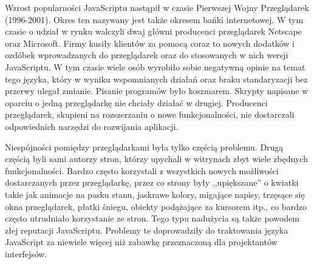 Wzrost popularności JavaScriptu nastąpił w czasie Pierwszej Wojny Przeglądarek (1996-2001)\cite{stefanov10}. Okres ten nazywany jest także okresem bańki internetowej. W tym czasie o udział w rynku walczyli dwaj główni producenci przeglądarek Netscape oraz Microsoft. Firmy kusiły klientów za pomocą coraz to nowych dodatków i ozdóbek wprowadzanych do przeglądarek oraz do stosowanych w nich wersji JavaScriptu. W tym czasie wiele osób wyrobiło sobie negatywną opinie na temat tego języka, który w wyniku wspomnianych działań oraz braku standaryzacji bez przerwy ulegał zmianie. Pisanie programów było koszmarem. Skrypty napisane w oparciu o jedną przeglądarkę nie chciały działać w drugiej. Producenci przeglądarek, skupieni na rozszerzaniu o nowe funkcjonalności, nie dostarczali odpowiednich narzędzi do rozwijania aplikacji\cite{stefanov10}.

Niespójności pomiędzy przeglądarkami była tylko częścią problemu. Drugą częścią byli sami autorzy stron, którzy upychali w witrynach zbyt wiele zbędnych funkcjonalności. Bardzo często korzystali z wszystkich nowych możliwości dostarczanych przez przeglądarkę, przez co strony były ,,upiększane'' o kwiatki takie jak animacje na pasku stanu, jaskrawe kolory, migające napisy, trzęsące się okna przeglądarek, płatki śniegu, obiekty podążające za kursorem itp., co bardzo często utrudniało korzystanie ze stron. Tego typu nadużycia są także powodem złej reputacji JavaScriptu. Problemy te doprowadziły do traktowania języka JavaScript za niewiele więcej niż zabawkę przeznaczoną dla projektantów interfejsów. 


